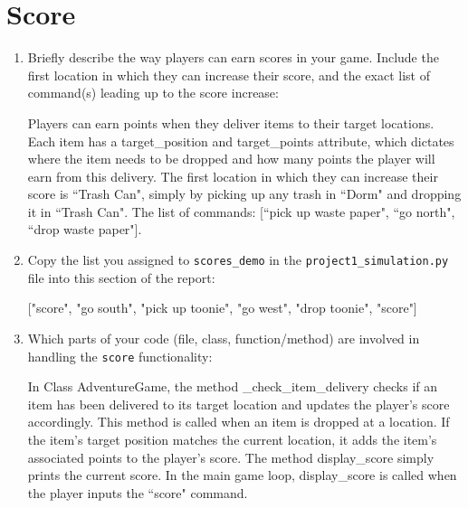 \documentclass[11pt]{article}
\begin{document}
\section*{Score}
\begin{enumerate}

    \item Briefly describe the way players can earn scores in your game. Include the first location in which they can increase their score, and the exact list of command(s) leading up to the score increase:

    Players can earn points when they deliver items to their target locations. Each item has a target\_position and target\_points attribute, which dictates where the item needs to be dropped and how many points the player will earn from this delivery. The first location in which they can increase their score is ``Trash Can", simply by picking up any trash in ``Dorm" and dropping it in ``Trash Can". The list of commands: [``pick up waste paper", ``go north", ``drop waste paper"].


    \item Copy the list you assigned to \texttt{scores\_demo} in the \texttt{project1\_simulation.py} file into this section of the report:

    ["score", "go south", "pick up toonie", "go west", "drop toonie", "score"]

    \item Which parts of your code (file, class, function/method) are involved in handling the \texttt{score} functionality:

    In Class AdventureGame, the method \_check\_item\_delivery checks if an item has been delivered to its target location and updates the player's score accordingly. This method is called when an item is dropped at a location. If the item’s target position matches the current location, it adds the item's associated points to the player's score. The method display\_score simply prints the current score. In the main game loop, display\_score is called when the player inputs the ``score" command.

\end{enumerate}
\end{document}
